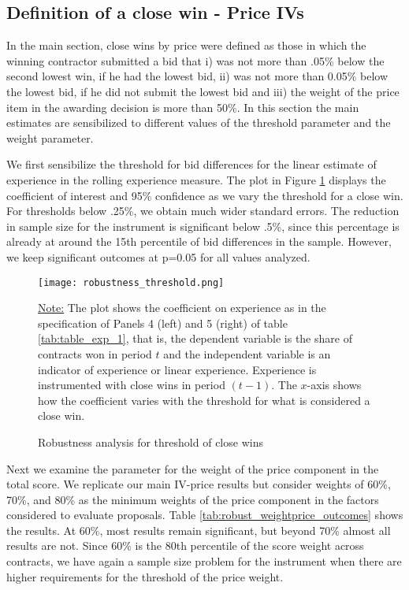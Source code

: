 \subsection{Definition of a close win - Price IVs}
In the main section, close wins by price were defined as those in which the winning contractor submitted a bid that i) was not more than .05\% below the second lowest win, if he had the lowest bid, ii) was not more than 0.05\% below the lowest bid, if he did not submit the lowest bid and iii) the weight of the price item in the awarding decision is more than 50\%. In this section the main estimates are sensibilized to different values of the threshold parameter and the weight parameter.

We first sensibilize the threshold for bid differences for the linear estimate of experience in the rolling experience measure. The plot in Figure \ref{fig:close_wins_robust} displays the coefficient of interest and 95\% confidence as we vary the threshold for a close win.  For thresholds below .25\%, we obtain much wider standard errors. The reduction in sample size for the instrument is significant below .5\%, since this percentage is already at around the 15th percentile of bid differences in the sample. However, we keep significant outcomes at p=0.05 for all values analyzed.

 \begin{figure}[H]
         \centering
         \texttt{[image: robustness\_threshold.png]}
         \caption{Robustness analysis for threshold of close wins}
         \label{fig:close_wins_robust}

  \vskip 0.5mm
  {\justifying\footnotesize\underline{Note:} The plot shows the coefficient on experience as in the specification of Panels 4 (left) and 5 (right) of table \ref{tab:table_exp_1}, that is, the dependent variable is the share of contracts won in period $t$ and the independent variable is an indicator of experience or linear experience. Experience is instrumented with close wins in period $(t-1)$. The $x$-axis shows how the coefficient varies with the threshold for what is considered a close win.\par}
 \end{figure}

Next we examine the parameter for the weight of the price component in the total score. We replicate our main IV-price results but consider weights  of 60\%, 70\%, and 80\% as the minimum weights of the price component in the factors considered to evaluate proposals. Table \ref{tab:robust_weightprice_outcomes} shows the results. At 60\%, most results remain significant, but beyond 70\% almost all results are not. Since 60\% is the 80th percentile of the score weight across contracts, we have again a sample size problem for the instrument when there are higher requirements for the threshold of the price weight.

